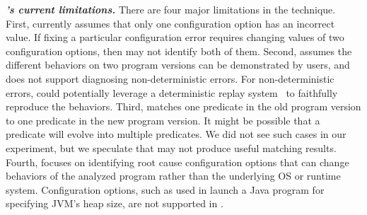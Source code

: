 \vspace{1mm}
\noindent \textbf{\textit{\ourtool's current limitations.}}
There are four major limitations in the \ourtool technique.
First, \ourtool currently assumes that only one
configuration option has an incorrect value.
If fixing a particular configuration error
requires changing values of two configuration options,
then \ourtool may not identify both of them.
Second, \ourtool assumes the different behaviors
on two program versions can be demonstrated by users,
and does not support diagnosing non-deterministic
errors. For non-deterministic errors, \ourtool
could potentially leverage a deterministic replay
system~\cite{Huang:2013:CRL, Jin:2012:BRF} to faithfully reproduce the behaviors.
Third, \ourtool matches one predicate in the old
program version to one predicate in the new program version.
It might be possible that a predicate will evolve
into multiple predicates. We did not see such cases
in our experiment, but we speculate that \ourtool
may not produce useful matching results.
Fourth, \ourtool focuses on identifying root cause
configuration options that can change behaviors of
the analyzed program rather than the underlying OS
or runtime system. Configuration options, such
as  used in launch a Java program for
specifying JVM's heap size, are not supported
in \ourtool.
